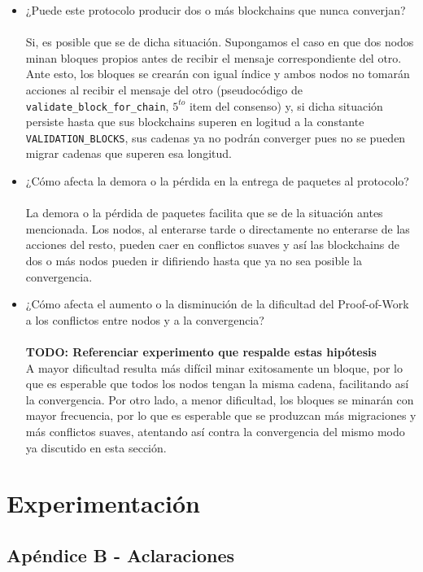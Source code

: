 \documentclass[10pt, a4paper, hidelinks]{article}
\begin{document}
\begin{itemize}
    \item ¿Puede este protocolo producir dos o más blockchains que nunca converjan? \\
    \\
    Si, es posible que se de dicha situación. Supongamos el caso en que dos nodos minan bloques propios antes de recibir el mensaje correspondiente del otro. Ante esto, los bloques se crearán con igual índice y ambos nodos no tomarán acciones al recibir el mensaje del otro (pseudocódigo de \texttt{validate\_block\_for\_chain}, $5^{to}$ item del consenso) y, si dicha situación persiste hasta que sus blockchains superen en logitud a la constante \texttt{VALIDATION\_BLOCKS}, sus cadenas ya no podrán converger pues no se pueden migrar cadenas que superen esa longitud.
    \item ¿Cómo afecta la demora o la pérdida en la entrega de paquetes al protocolo? \\
    \\
    La demora o la pérdida de paquetes facilita que se de la situación antes mencionada. Los nodos, al enterarse tarde o directamente no enterarse de las acciones del resto, pueden caer en conflictos suaves y así las blockchains de dos o más nodos pueden ir difiriendo hasta que ya no sea posible la convergencia.
    \item ¿Cómo afecta el aumento o la disminución de la dificultad del Proof-of-Work a los conflictos entre nodos y a la convergencia? \\
    \\
    \textbf{TODO: Referenciar experimento que respalde estas hipótesis} \\
    A mayor dificultad resulta más difícil minar exitosamente un bloque, por lo que es esperable que todos los nodos tengan la misma cadena, facilitando así la convergencia. Por otro lado, a menor dificultad, los bloques se minarán con mayor frecuencia, por lo que es esperable que se produzcan más migraciones y más conflictos suaves, atentando así contra la convergencia del mismo modo ya discutido en esta sección.   
\end{itemize}

\section{Experimentación}


\newpage



\subsection{Apéndice B - Aclaraciones}
\end{document}

